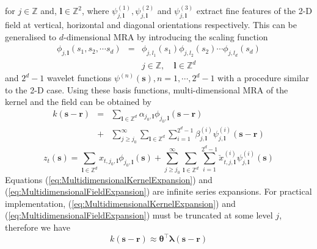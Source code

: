 \documentclass[11pt,draftcls,onecolumn,peerreview]{IEEEtran}
\begin{document}
for $j \in \mathbb{Z}$ and, $\mathbf{l} \in \mathbb{Z}^2$, where $\psi_{j,\mathbf{l}}^{(1)},  \psi_{j,\mathbf{l}}^{(2)}$ and $\psi_{j,\mathbf{l}}^{(3)} $ extract fine features of the 2-D field at vertical, horizontal and diagonal orientations respectively.
This can be generalised to $d$-dimensional MRA by introducing the scaling function
\setlength{\arraycolsep}{0.0em}
\begin{eqnarray}
  \phi_{j,\mathbf{l}}\left(s_1,s_2, \cdots s_d\right)&=&\phi_{j,l_1}\left(s_1\right)\phi_{j,l_2}\left(s_2\right) \cdots \phi_{j,l_d}\left(s_d\right) \label{eq:d-dimensionalscalingfunction}\\
 &&j \in \mathbb{Z}, \quad \mathbf{l} \in \mathbb{Z}^d \nonumber
\end{eqnarray}
\setlength{\arraycolsep}{5pt}
and $2^d-1$ wavelet functions $ \psi^{(n)} \left(\mathbf{s}\right), n=1, \cdots,2^d-1$ with a procedure similar to the 2-D case. Using these basis functions, multi-dimensional MRA of the kernel and the field can be obtained by
\setlength{\arraycolsep}{0.0em}
\begin{eqnarray}
 k\left(\mathbf{s}-\mathbf{r}\right)&=&\sum_{\mathbf{l}\in \mathbb{Z}^d}\alpha_{j_0,\mathbf{l}}\phi_{j_0,\mathbf{l}}\left(\mathbf{s}-\mathbf{r}\right) \nonumber \\
&+&\sum_{j\geq j_0}^{\infty} \sum_{\mathbf{l}\in \mathbb{Z}^d}\sum_{i=1}^{2^d-1}\beta_{j,\mathbf{l}}^{(i)} \psi_{j,\mathbf{l}}^{(i)}\left(\mathbf{s}-\mathbf{r}\right) 
\label{eq:MultidimensionalKernelExpansion}
\end{eqnarray}
\setlength{\arraycolsep}{5pt}
\begin{equation}
z_t\left(\mathbf{s}\right)=\sum_{\mathbf{l}\in \mathbb{Z}^d}x_{t,j_{0},\mathbf{l}}\phi_{j_{0},\mathbf{l}}\left(\mathbf{s}\right)+\sum_{j\geq j_0}^{\infty} \sum_{\mathbf{l}\in \mathbb{Z}^d}\sum_{i=1}^{2^d-1} \check{x}_{t,j,\mathbf{l}}^{(i)}\psi_{j,\mathbf{l}}^{(i)}\left(\mathbf{s}\right)
\label{eq:MultidimensionalFieldExpansion}
\end{equation}
Equations (\ref{eq:MultidimensionalKernelExpansion}) and (\ref{eq:MultidimensionalFieldExpansion}) are infinite series expansions. For practical implementation, (\ref{eq:MultidimensionalKernelExpansion}) and (\ref{eq:MultidimensionalFieldExpansion}) must be truncated at some level $j$, therefore we have
 \begin{equation}
 k\left(\mathbf{s}-\mathbf{r}\right)\approx \boldsymbol\theta^\top\boldsymbol\lambda\left(\mathbf{s}-\mathbf{r}\right)
\label{eq:KernelFiniteExpansion}
\end{equation}
\end{document}
